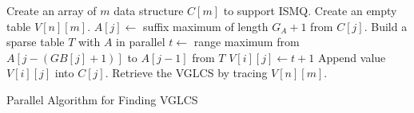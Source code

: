 \begin{algorithm}
\SetAlgoNoLine
{}
    
Create an array of $m$ data structure $C[m]$ to support ISMQ.\;
Create an empty table $V[n][m]$. \;
 {
   {
    $A[j] \gets$ suffix maximum of length $G_A + 1$ from $C[j]$. \;
  }
  Build a sparse table $T$ with $A$ in parallel\;
   {
     {
        $t \gets $ range maximum from $A[j - (GB[j] + 1)]$ to $A[j-1]$ from $T$ \;
        $V[i][j] \gets t + 1$ \;
        Append value $V[i][j]$ into $C[j]$. \;
    }
  }
}
Retrieve the VGLCS by tracing $V[n][m]$. \;
  \caption{Parallel Algorithm for Finding VGLCS}
  \label{alg:parallel-VGLCS}
\end{algorithm}

